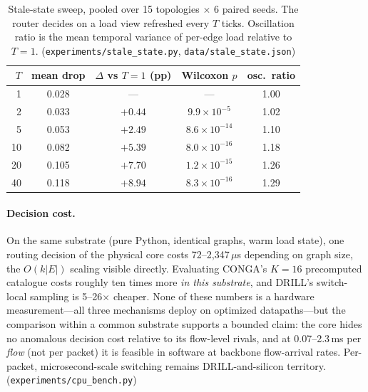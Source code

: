 \begin{table}[t]
\centering
\caption{Stale-state sweep, pooled over 15 topologies $\times$ 6 paired
seeds. The router decides on a load view refreshed every $T$ ticks.
Oscillation ratio is the mean temporal variance of per-edge load relative to
$T{=}1$. (\texttt{experiments/stale\_state.py},
\texttt{data/stale\_state.json})}
\label{tab:stale}
\begin{tabular}{rcccc}
\toprule
$T$ & mean drop & $\Delta$ vs $T{=}1$ (pp) & Wilcoxon $p$ & osc.\ ratio \\
\midrule
1  & 0.028 & ---     & ---                & 1.00 \\
2  & 0.033 & $+0.44$ & $9.9\times10^{-5}$ & 1.02 \\
5  & 0.053 & $+2.49$ & $8.6\times10^{-14}$ & 1.10 \\
10 & 0.082 & $+5.39$ & $8.0\times10^{-16}$ & 1.18 \\
20 & 0.105 & $+7.70$ & $1.2\times10^{-15}$ & 1.26 \\
40 & 0.118 & $+8.94$ & $8.3\times10^{-16}$ & 1.29 \\
\bottomrule
\end{tabular}
\end{table}

\paragraph{Decision cost.}
On the same substrate (pure Python, identical graphs, warm load state), one
routing decision of the physical core costs 72--2{,}347\,$\mu$s depending on
graph size, the $O(k|E|)$ scaling visible directly. Evaluating CONGA's $K{=}16$
precomputed catalogue costs roughly ten times more \emph{in this substrate},
and DRILL's switch-local sampling is 5--26$\times$ cheaper. None of these
numbers is a hardware measurement---all three mechanisms deploy on optimized
datapaths---but the comparison within a common substrate supports a bounded
claim: the core hides no anomalous decision cost relative to its flow-level
rivals, and at 0.07--2.3\,ms per \emph{flow} (not per packet) it is feasible
in software at backbone flow-arrival rates. Per-packet, microsecond-scale
switching remains DRILL-and-silicon territory.
(\texttt{experiments/cpu\_bench.py})

